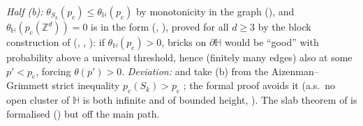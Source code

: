 \documentclass[11pt]{article}
\theoremstyle{definition}
\theoremstyle{remark}
\newcommand{\Zd}{\mathbb{Z}^d}
\newcommand{\pc}{p_{\mathrm c}}
\newcommand{\HH}{\mathbb{H}}
\begin{document}
 \emph{Half (b):} $\theta_{S_k}(\pc)\le\theta_\HH(\pc)$ by monotonicity in the graph (), and $\theta_\HH(\pc(\Zd))=0$ is
\citep[Thm.~1.1]{BarskyGrimmettNewman1991} in the form \citep[Thm.~(7.35)]{GrimmettPercolation1999} (,
), proved for all $d\ge3$ by the block construction of \citep[\S7.3, Lemmas~(7.36), (7.52)]{GrimmettPercolation1999}
(, , ): if $\theta_\HH(\pc)>0$, bricks on $\partial\HH$ would be ``good'' with
probability above a universal threshold, hence (finitely many edges) also at some $p'<\pc$, forcing $\theta(p')>0$.  \emph{Deviation:}
\citep[p.~25]{KozmaNitzan2024} and \citep[(7.38)]{GrimmettPercolation1999} take (b) from the Aizenman--Grimmett strict inequality $\pc(S_k)>\pc$
\citep{AizenmanGrimmett1991}; the formal proof avoids it (a.s.\ no open cluster of $\HH$ is both infinite and of bounded height,
).  The slab theorem of \citep{DuminilCopinSidoraviciusTassion2016} is formalised
() but off the main path.
\end{document}
